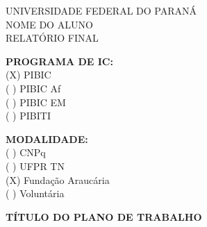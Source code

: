 \documentclass[a4paper, 12pt]{article}
\begin{document}
\clearpage
\thispagestyle{empty}

\begin{bfseries}
\begin{center}

\vspace{0.5cm} 
UNIVERSIDADE FEDERAL DO PARANÁ \\

\vspace{0.6cm}
NOME DO ALUNO\\
\vspace{2.5cm}
RELATÓRIO FINAL \\

\vspace{1cm}

\begin{minipage}[t]{0.45\textwidth}\hspace{3cm}
\raggedright
\textbf{PROGRAMA DE IC:}\\ \hspace{3cm}
\textnormal{(X) PIBIC}\\ \hspace{3cm}
\textnormal{( ) PIBIC Af}\\ \hspace{3cm}
\textnormal{( ) PIBIC EM}\\ \hspace{3cm}
\textnormal{( ) PIBITI}\\ \hspace{3cm}

\end{minipage}
\begin{minipage}[t]{0.45\textwidth}\hspace{1cm}
\raggedright
\textbf{MODALIDADE:}\\ \hspace{1cm}
\textnormal{( ) CNPq}\\ \hspace{1cm}
\textnormal{( ) UFPR TN}\\ \hspace{1cm}
\textnormal{(X) Fundação Araucária}\\ \hspace{1cm}
\textnormal{( ) Voluntária}\\ \hspace{1cm}

\end{minipage}

\vspace*{1cm}
\textbf{\MakeUppercase{Título do Plano de Trabalho}} \\


\end{center}
\end{bfseries}
\end{document}
